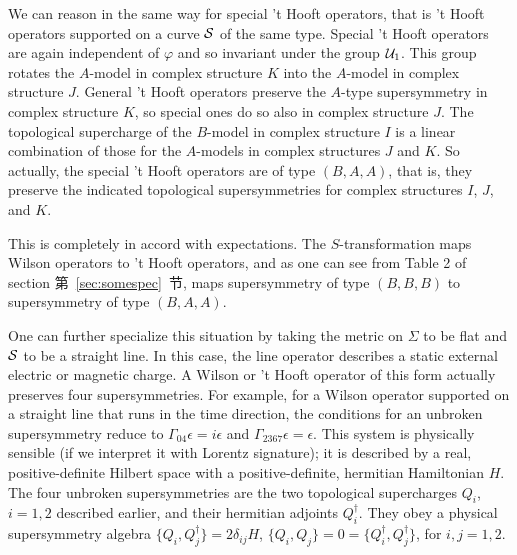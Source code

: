 We can reason in the same way for special 't Hooft operators, that
is 't Hooft operators supported on a curve ${{\cal S}}$ of the
same type. Special 't Hooft operators are again independent of
$\varphi$ and so invariant under the group ${\cal U}_1$.  This
group rotates the $A$-model in complex structure $K$ into the
$A$-model in complex structure $J$.  General 't Hooft operators
preserve the $A$-type supersymmetry in complex structure $K$, so
special ones do so also in complex structure $J$.  The topological
supercharge of the $B$-model in complex structure $I$ is a linear
combination of those for the $A$-models in complex structures $J$
and $K$.  So actually, the special 't Hooft operators are of type
$(B,A,A)$, that is, they preserve the indicated topological
supersymmetries for complex structures $I$, $J$, and $K$.

This is completely in accord with expectations.  The
$S$-transformation maps Wilson operators to 't Hooft operators,
and as one can see from Table 2 of section 第~\ref{sec:somespec}~节, maps
supersymmetry of type $(B,B,B)$ to supersymmetry of type
$(B,A,A)$.

One can further specialize this situation by taking the metric on
$\Sigma$ to be flat and ${{\cal S}}$ to be a straight line.  In
this case, the line operator describes a static external electric
or magnetic charge.  A Wilson or 't Hooft operator of this form
actually preserves four supersymmetries. For example, for a Wilson
operator supported on a straight line that runs in the time
direction, the conditions for an unbroken supersymmetry reduce to
$\Gamma_{04}\epsilon=i\epsilon$ and
$\Gamma_{2367}\epsilon=\epsilon$.  This system is physically
sensible (if we interpret it with Lorentz signature); it is
described by a real, positive-definite Hilbert space with a
positive-definite, hermitian Hamiltonian $H$. The four unbroken
supersymmetries are the two topological supercharges $Q_i$,
$i=1,2$ described earlier, and their hermitian adjoints
$Q^\dagger_i$.  They obey a physical supersymmetry algebra
$\{Q_i,Q^\dagger_j\}=2\delta_{ij}H$,
$\{Q_i,Q_j\}=0=\{Q^\dagger_i,Q^\dagger_j\}$, for $i,j=1,2$.
